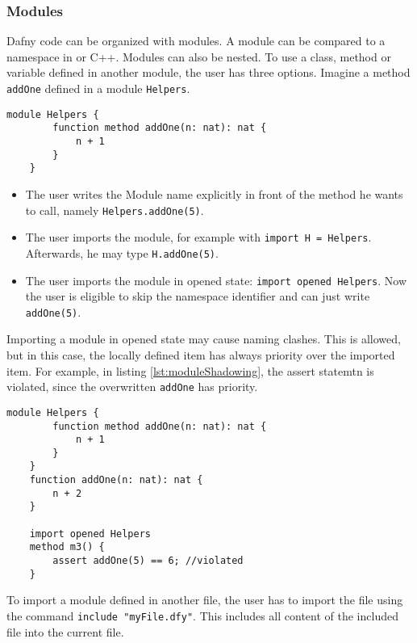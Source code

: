 \subsubsection{Modules}
Dafny code can be organized with modules. A module can be compared to a namespace in \Csharp or C++. Modules can also be nested. To use a class, method or variable defined in another module, the user has three options. Imagine a method \texttt{addOne} defined in a module \texttt{Helpers}.

\begin{lstlisting}[caption={Module Example}, captionpos=b, label={lst:shadowing}]
    module Helpers {
        function method addOne(n: nat): nat {
            n + 1
        }
    }
\end{lstlisting}

\begin{itemize}
    \item The user writes the Module name explicitly in front of the method he wants to call, \linebreak namely \texttt{Helpers.addOne(5)}.
    \item The user imports the module, for example with \texttt{import H = Helpers}. Afterwards, he may type \texttt{H.addOne(5)}.
    \item The user imports the module in opened state: \texttt{import opened Helpers}. Now the user is eligible to skip the namespace identifier and can just write \texttt{addOne(5)}.
\end{itemize}

Importing a module in opened state may cause naming clashes. This is allowed, but in this case, the locally defined item has always priority over the imported item. For example, in listing \ref{lst:moduleShadowing}, the assert statemtn is violated, since the overwritten \texttt{addOne} has priority. \cite{functionVSMethod}

\begin{lstlisting}[caption={Naming Clash}, captionpos=b, label={lst:moduleShadowing}]
    module Helpers {
        function method addOne(n: nat): nat {
            n + 1
        }
    }
    function addOne(n: nat): nat {
        n + 2
    }

    import opened Helpers
    method m3() {
        assert addOne(5) == 6; //violated
    }

\end{lstlisting}

To import a module defined in another file, the user has to import the file using the command \texttt{include "myFile.dfy"}. This includes all content of the included file into the current file.

